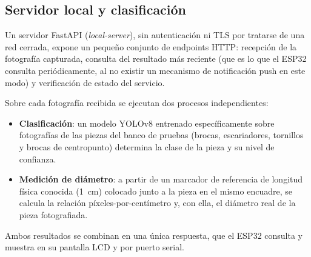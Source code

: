 \subsection{Servidor local y clasificación}
Un servidor FastAPI (\textit{local-server}), sin autenticación ni TLS
por tratarse de una red cerrada, expone un pequeño conjunto de
endpoints HTTP: recepción de la fotografía capturada, consulta del
resultado más reciente (que es lo que el ESP32 consulta
periódicamente, al no existir un mecanismo de notificación push en
este modo) y verificación de estado del servicio.

Sobre cada fotografía recibida se ejecutan dos procesos
independientes:

\begin{itemize}
  \item \textbf{Clasificación}: un modelo YOLOv8 entrenado
  específicamente sobre fotografías de las piezas del banco de pruebas
  (brocas, escariadores, tornillos y brocas de centropunto) determina
  la clase de la pieza y su nivel de confianza.
  \item \textbf{Medición de diámetro}: a partir de un marcador de
  referencia de longitud física conocida (1~cm) colocado junto a la
  pieza en el mismo encuadre, se calcula la relación
  píxeles-por-centímetro y, con ella, el diámetro real de la pieza
  fotografiada.
\end{itemize}

Ambos resultados se combinan en una única respuesta, que el ESP32
consulta y muestra en su pantalla LCD y por puerto serial.
